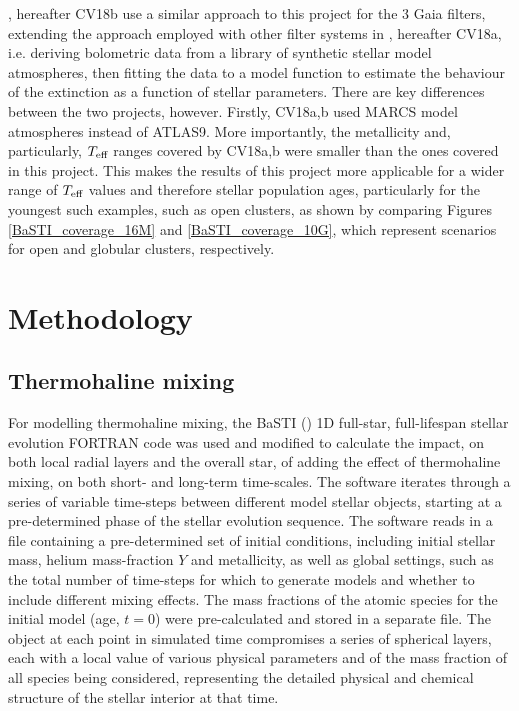 \documentclass[12pt, a4paper]{report}
\begin{document}
\cite{2018MNRAS.479L.102C}, hereafter CV18b use a similar approach to this project for the 3 Gaia filters, extending the approach employed with other filter systems in \cite{2018MNRAS.475.5023C}, hereafter CV18a, i.e. deriving bolometric data from a library of synthetic stellar model atmospheres, then fitting the data to a model function to estimate the behaviour of the extinction as a function of stellar parameters. There are key differences between the two projects, however. Firstly, CV18a,b used MARCS model atmospheres instead of ATLAS9. More importantly, the metallicity and, particularly, $T_{\textnormal{eff}}$ ranges covered by CV18a,b were smaller than the ones covered in this project. This makes the results of this project more applicable for a wider range of $T_{\textnormal{eff}}$ values and therefore stellar population ages, particularly for the youngest such examples, such as open clusters, as shown by comparing Figures \ref{BaSTI_coverage_16M} and \ref{BaSTI_coverage_10G}, which represent scenarios for open and globular clusters, respectively.

\chapter{Methodology} \label{Methodology}
\section{Thermohaline mixing}

For modelling thermohaline mixing, the BaSTI (\cite{2004ApJ...612..168P}) 1D full-star, full-lifespan stellar evolution FORTRAN code was used and modified to calculate the impact, on both local radial layers and the overall star, of adding the effect of thermohaline mixing, on both short- and long-term time-scales. The software iterates through a series of variable time-steps between different model stellar objects, starting at a pre-determined phase of the stellar evolution sequence. The software reads in a file containing a pre-determined set of initial conditions, including initial stellar mass, helium mass-fraction $Y$ and metallicity, as well as global settings, such as the total number of time-steps for which to generate models and whether to include different mixing effects. The mass fractions of the atomic species for the initial model (age, $t = 0$) were pre-calculated and stored in a separate file.
The object at each point in simulated time compromises a series of spherical layers, each with a local value of various physical parameters and of the mass fraction of all species being considered, representing the detailed physical and chemical structure of the stellar interior at that time.
\end{document}
